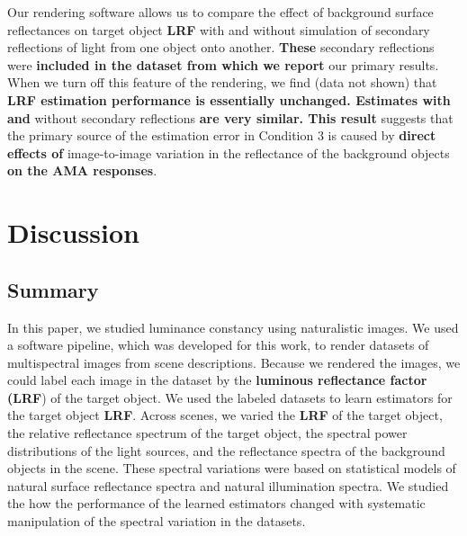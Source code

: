 \documentclass{jov}
\providecommand{\DIFaddtex}[1]{{\bf #1}} %
\providecommand{\DIFdeltex}[1]{} %
\providecommand{\DIFaddbegin}{} %
\providecommand{\DIFaddend}{} %
\providecommand{\DIFdelbegin}{} %
\providecommand{\DIFdelend}{} %
\providecommand{\DIFadd}[1]{\texorpdfstring{\DIFaddtex{#1}}{#1}} %
\providecommand{\DIFdel}[1]{\texorpdfstring{\DIFdeltex{#1}}{}} %
\newcommand{\DIFscaledelfig}{0.5}
\newlength{\DIFdelgraphicswidth} %
\newlength{\DIFdelgraphicsheight} %
\newcommand{\DIFaddincludegraphics}[2][]{{\color{blue}\fbox{\DIFOincludegraphics[#1]{#2}}}} %
\newcommand{\DIFdelincludegraphics}[2][]{%
\sbox{\DIFdelgraphicsbox}{\DIFOincludegraphics[#1]{#2}}%
\settoboxwidth{\DIFdelgraphicswidth}{\DIFdelgraphicsbox} %
\settoboxtotalheight{\DIFdelgraphicsheight}{\DIFdelgraphicsbox} %
\scalebox{\DIFscaledelfig}{%
\parbox[b]{\DIFdelgraphicswidth}{\usebox{\DIFdelgraphicsbox}\\[-\baselineskip] \rule{\DIFdelgraphicswidth}{0em}}\llap{\resizebox{\DIFdelgraphicswidth}{\DIFdelgraphicsheight}{%
\setlength{\unitlength}{\DIFdelgraphicswidth}%
\begin{picture}(1,1)%
\thicklines\linethickness{2pt} %
{\color[rgb]{1,0,0}\put(0,0){\framebox(1,1){}}}%
{\color[rgb]{1,0,0}\put(0,0){\line( 1,1){1}}}%
{\color[rgb]{1,0,0}\put(0,1){\line(1,-1){1}}}%
\end{picture}%
}\hspace*{3pt}}} %
} %
\DeclareRobustCommand{\DIFaddbegin}{\DIFOaddbegin \let\includegraphics\DIFaddincludegraphics} %
\DeclareRobustCommand{\DIFaddend}{\DIFOaddend \let\includegraphics\DIFOincludegraphics} %
\DeclareRobustCommand{\DIFdelbegin}{\DIFOdelbegin \let\includegraphics\DIFdelincludegraphics} %
\DeclareRobustCommand{\DIFdelend}{\DIFOaddend \let\includegraphics\DIFOincludegraphics} %
\begin{document}
Our rendering software allows us to compare the effect of background surface reflectances on target object \DIFdelbegin \DIFdel{LRV }\DIFdelend \DIFaddbegin \DIFadd{LRF }\DIFaddend with and without simulation of secondary reflections of light from one object onto another. 
\DIFdelbegin \DIFdel{Such }\DIFdelend \DIFaddbegin \DIFadd{These }\DIFaddend secondary reflections were \DIFdelbegin \DIFdel{simulated for }\DIFdelend \DIFaddbegin \DIFadd{included in the dataset from which we report }\DIFaddend our primary results. 
When we turn off this feature of the rendering, we find (data not shown) that \DIFdelbegin \DIFdel{that the secondary reflections have minimal effect on LRV estimation :
the estimates }\DIFdelend \DIFaddbegin \DIFadd{LRF estimation performance is essentially unchanged. 
Estimates with and }\DIFaddend without secondary reflections \DIFdelbegin \DIFdel{were similarto those with reflections. 
This }\DIFdelend \DIFaddbegin \DIFadd{are very similar. 
This result }\DIFaddend suggests that the primary source of the estimation error in Condition 3 is caused by \DIFaddbegin \DIFadd{direct effects of }\DIFaddend image-to-image variation in the reflectance of the background objects \DIFdelbegin \DIFdel{,
which in turn affects the normalized contrast representation of the target}\DIFdelend \DIFaddbegin \DIFadd{on the AMA responses}\DIFaddend .

\section{Discussion} \label{Discussion}

\subsection{Summary}
In this paper, we studied luminance constancy using naturalistic images.
We used a software pipeline, which was developed for this work, to render datasets of multispectral images from scene descriptions.
Because we rendered the images, we could label each image in the dataset by the \DIFdelbegin \DIFdel{light reflectance value (LRV}\DIFdelend \DIFaddbegin \DIFadd{luminous reflectance factor (LRF}\DIFaddend ) of the target object.
We used the labeled datasets to learn estimators for the target object \DIFdelbegin \DIFdel{LRV}\DIFdelend \DIFaddbegin \DIFadd{LRF}\DIFaddend .
Across scenes, we varied the \DIFdelbegin \DIFdel{LRV }\DIFdelend \DIFaddbegin \DIFadd{LRF }\DIFaddend of the target object, the relative reflectance spectrum of the target object, 
the spectral power distributions of the light sources, and the reflectance spectra of the background objects in the scene.
These spectral variations were based on statistical models of natural surface reflectance spectra and natural illumination spectra.
We studied the how the performance of the learned estimators changed with systematic manipulation of the spectral variation in the datasets.
\end{document}
